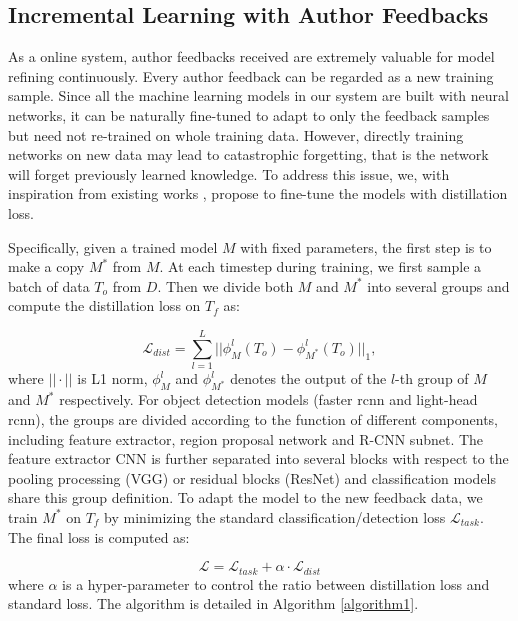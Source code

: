 \documentclass[sigconf]{acmart}
\begin{document}
\subsection{Incremental Learning with Author Feedbacks}
As a online system, author feedbacks received are extremely valuable for model refining continuously. Every author feedback can be regarded as a new training sample. Since all the machine learning models in our system are built with neural networks, it can be naturally fine-tuned to adapt to only the feedback samples but need not re-trained on whole training data. However, directly training networks on new data may lead to catastrophic forgetting, that is the network will forget previously learned knowledge. To address this issue, we, with inspiration from existing works \cite{shmelkov2017incremental, yuan2018text}, propose to fine-tune the models with distillation loss.

Specifically, given a trained model $M$ with fixed parameters, the first step is to make a copy $M^{*}$ from $M$. At each timestep during training, we first sample a batch of data $T_{o}$ from $D$. Then we divide both $M$ and $M^{*}$ into several groups and compute the distillation loss on $T_{f}$ as:

\begin{equation}
\label{eqn_dist}
	\mathcal{L}_{dist} = \sum_{l=1}^{L}||\phi_{M}^{l}(T_{o})-\phi_{M^{*}}^{l}(T_{o}) ||_{1},
\end{equation}
where $||\cdot||$ is L1 norm, $\phi_{M}^{l}$ and $\phi_{M^{*}}^{l}$ denotes the output of the $l$-th group of $M$ and $M^{*}$ respectively. For object detection models (faster rcnn and light-head rcnn), the groups are divided according to the function of different components, including feature extractor, region proposal network and R-CNN subnet. The feature extractor CNN is further separated into several blocks with respect to the pooling processing (VGG) or residual blocks (ResNet) and classification models share this group definition. To adapt the model to the new feedback data, we train $M^{*}$ on $T_{f}$ by minimizing the standard classification/detection loss $\mathcal{L}_{task}$. The final loss is computed as:

\begin{equation}
\mathcal{L}=\mathcal{L}_{task} + \alpha\cdot\mathcal{L}_{dist}
\end{equation}
where $\alpha$ is a hyper-parameter to control the ratio between distillation loss and standard loss. The algorithm is detailed in Algorithm \ref{algorithm1}.
\end{document}
